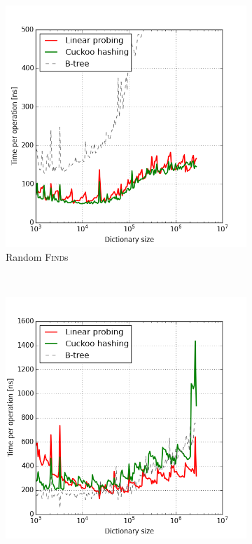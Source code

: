 \begin{figure}
\begin{subfigure}[t]{0.45\textwidth}
	\includegraphics[width=\textwidth]{img/performance/hashing-1}
	\caption{Random \textsc{Find}s}
\end{subfigure}
~
\begin{subfigure}[t]{0.45\textwidth}
	\includegraphics[width=\textwidth]{img/performance/hashing-2}

\end{subfigure}
\end{figure}
